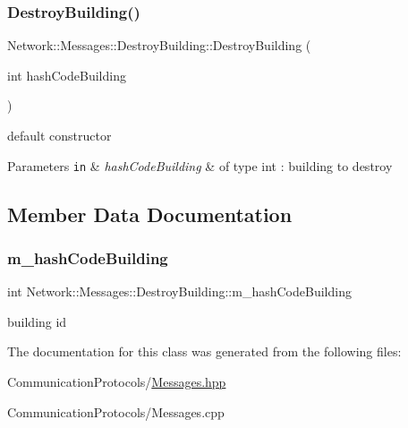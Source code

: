 \subsubsection{\texorpdfstring{Destroy\+Building()}{DestroyBuilding()}}
{\footnotesize\ttfamily Network\+::\+Messages\+::\+Destroy\+Building\+::\+Destroy\+Building (\begin{DoxyParamCaption}\item[{int}]{hash\+Code\+Building }\end{DoxyParamCaption})\hspace{0.3cm}{\ttfamily [inline]}}



default constructor 


\begin{DoxyParams}[1]{Parameters}
\mbox{\tt in}  & {\em hash\+Code\+Building} & of type int \+: building to destroy \\
\hline
\end{DoxyParams}


\subsection{Member Data Documentation}
\mbox{\label{class_network_1_1_messages_1_1_destroy_building_a854e9a269861b0fcea6d3ee2d349c899}} 
\subsubsection{\texorpdfstring{m\+\_\+hash\+Code\+Building}{m\_hashCodeBuilding}}
{\footnotesize\ttfamily int Network\+::\+Messages\+::\+Destroy\+Building\+::m\+\_\+hash\+Code\+Building}

building id 

The documentation for this class was generated from the following files\+:\begin{DoxyCompactItemize}
\item 
Communication\+Protocols/\hyperlink{_messages_8hpp}{Messages.\+hpp}\item 
Communication\+Protocols/Messages.\+cpp\end{DoxyCompactItemize}
